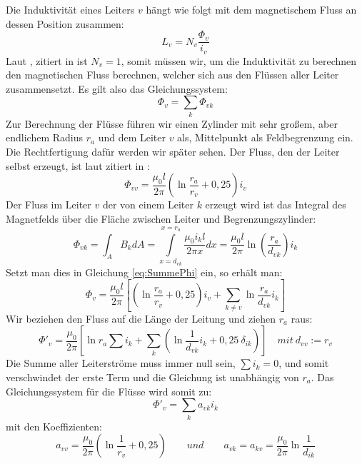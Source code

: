 Die Induktivität eines Leiters $v$ hängt wie folgt mit dem magnetischem Fluss an dessen Position zusammen:
\begin{equation}
L_v = N_v \frac{\Phi_v}{i_v}
\end{equation}
Laut \cite{Moeller}, zitiert in \cite{Flosdorff}
ist $N_v = 1$, somit müssen wir, um die Induktivität zu berechnen den magnetischen Fluss berechnen, welcher sich aus den Flüssen aller Leiter zusammensetzt. Es gilt also das Gleichungssystem:
\begin{equation}\label{eq:SummePhi}
\Phi_v = \sum_k \Phi_{vk}
\end{equation}
Zur Berechnung der Flüsse führen wir einen Zylinder mit sehr großem, aber endlichem Radius $r_a$ und dem Leiter $v$ als, Mittelpunkt als Feldbegrenzung ein. Die Rechtfertigung dafür werden wir später sehen.
Der Fluss, den der Leiter selbst erzeugt, ist laut \cite{Moeller} zitiert in \cite{Flosdorff}:
\begin{equation}
\Phi_{vv} = \frac{\mu_0l}{2\pi} \left( \ln\frac{r_a}{r_v} + 0,25 \right) i_v
\end{equation}
Der Fluss im Leiter $v$ der von einem Leiter $k$ erzeugt wird ist das Integral des Magnetfelds über die Fläche zwischen Leiter und Begrenzungszylinder:
\begin{equation}
\Phi_{vk} = \int_A B_k dA = \int\limits_{x=d_{vk}}^{x=r_a} \frac{\mu_0i_k l}{2\pi x}dx =
\frac{\mu_0l}{2\pi}\ln\left(\frac{r_a}{d_{vk}}\right) i_k
\end{equation}
Setzt man dies in Gleichung \ref{eq:SummePhi} ein, so erhält man:
\begin{equation}
\Phi_v = \frac{\mu_0l}{2\pi} \left[ \left( \ln\frac{r_a}{r_v} +0,25\right) i_v + \sum_{k\neq v}\ln\frac{r_a}{d_{vk}} i_k \right]
\end{equation}
Wir beziehen den Fluss auf die Länge der Leitung und ziehen $r_a$ raus:
\begin{equation}
\Phi'_v = \frac{\mu_0}{2\pi}
 \left[
   \ln r_a \sum i_k +
   \sum_k \left( \ln\frac{1}{d_{vk}} i_k +
   0,25 \: \delta_{ik} \right)
 \right]
\quad mit \: d_{vv}:=r_v
\end{equation}
Die Summe aller Leiterströme muss immer null sein, $\sum i_k=0$, und somit verschwindet der erste Term und die Gleichung ist unabhängig von $r_a$. Das Gleichungssystem für die Flüsse wird somit zu:
\begin{equation}
\Phi'_v = \sum_k a_{vk}i_k
\end{equation}
mit den Koeffizienten:
\begin{equation}
a_{vv} = \frac{\mu_0}{2\pi} \left( \ln\frac{1}{r_v} + 0,25 \right) \qquad und \qquad a_{vk} = a_{kv} = \frac{\mu_0}{2\pi} \ln\frac{1}{d_{ik}}
\end{equation}
